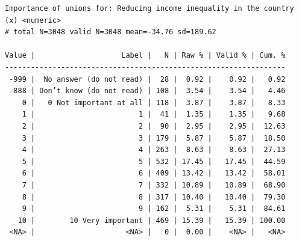 \documentclass[
  letterpaper,
  DIV=11,
  numbers=noendperiod]{scrreprt}
\newenvironment{Shaded}{\begin{snugshade}}{\end{snugshade}}
\newcommand{\AttributeTok}[1]{\textcolor[rgb]{0.40,0.45,0.13}{#1}}
\newcommand{\FunctionTok}[1]{\textcolor[rgb]{0.28,0.35,0.67}{#1}}
\newcommand{\NormalTok}[1]{\textcolor[rgb]{0.00,0.23,0.31}{#1}}
\newcommand{\OtherTok}[1]{\textcolor[rgb]{0.00,0.23,0.31}{#1}}
\newcommand{\SpecialCharTok}[1]{\textcolor[rgb]{0.37,0.37,0.37}{#1}}
\newcommand{\StringTok}[1]{\textcolor[rgb]{0.13,0.47,0.30}{#1}}
\begin{document}
\begin{verbatim}
Importance of unions for: Reducing income inequality in the country (x) <numeric> 
# total N=3048 valid N=3048 mean=-34.76 sd=189.62

Value |                    Label |   N | Raw % | Valid % | Cum. %
-----------------------------------------------------------------
 -999 |  No answer (do not read) |  28 |  0.92 |    0.92 |   0.92
 -888 | Don’t know (do not read) | 108 |  3.54 |    3.54 |   4.46
    0 |   0 Not important at all | 118 |  3.87 |    3.87 |   8.33
    1 |                        1 |  41 |  1.35 |    1.35 |   9.68
    2 |                        2 |  90 |  2.95 |    2.95 |  12.63
    3 |                        3 | 179 |  5.87 |    5.87 |  18.50
    4 |                        4 | 263 |  8.63 |    8.63 |  27.13
    5 |                        5 | 532 | 17.45 |   17.45 |  44.59
    6 |                        6 | 409 | 13.42 |   13.42 |  58.01
    7 |                        7 | 332 | 10.89 |   10.89 |  68.90
    8 |                        8 | 317 | 10.40 |   10.40 |  79.30
    9 |                        9 | 162 |  5.31 |    5.31 |  84.61
   10 |        10 Very important | 469 | 15.39 |   15.39 | 100.00
 <NA> |                     <NA> |   0 |  0.00 |    <NA> |   <NA>
\end{verbatim}

\begin{Shaded}
\end{Shaded}
\end{document}
